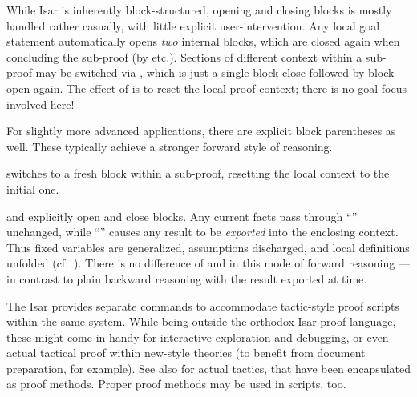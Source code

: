 \begin{isabellebody}
\begin{isamarkuptext}
  While Isar is inherently block-structured, opening and closing
  blocks is mostly handled rather casually, with little explicit
  user-intervention.  Any local goal statement automatically opens
  \emph{two} internal blocks, which are closed again when concluding
  the sub-proof (by \hyperlink{command.qed}{\mbox{}} etc.).  Sections of different
  context within a sub-proof may be switched via \hyperlink{command.next}{\mbox{}},
  which is just a single block-close followed by block-open again.
  The effect of \hyperlink{command.next}{\mbox{}} is to reset the local proof context;
  there is no goal focus involved here!

  For slightly more advanced applications, there are explicit block
  parentheses as well.  These typically achieve a stronger forward
  style of reasoning.

  \begin{descr}

  \item [\hyperlink{command.next}{\mbox{\isa{\isacommand{next}}}}] switches to a fresh block within a
  sub-proof, resetting the local context to the initial one.

  \item [\hyperlink{command.braceleft}{\mbox{\isa{\isacommand{{\isacharbraceleft}}}}} and \hyperlink{command.braceright}{\mbox{\isa{\isacommand{{\isacharbraceright}}}}}] explicitly open and close
  blocks.  Any current facts pass through ``\hyperlink{command.braceleft}{\mbox{\isa{\isacommand{{\isacharbraceleft}}}}}''
  unchanged, while ``\hyperlink{command.braceright}{\mbox{\isa{\isacommand{{\isacharbraceright}}}}}'' causes any result to be
  \emph{exported} into the enclosing context.  Thus fixed variables
  are generalized, assumptions discharged, and local definitions
  unfolded (cf.\ ).  There is no difference
  of \hyperlink{command.assume}{\mbox{}} and \hyperlink{command.presume}{\mbox{}} in this mode of
  forward reasoning --- in contrast to plain backward reasoning with
  the result exported at \hyperlink{command.show}{\mbox{}} time.

  \end{descr}%
\end{isamarkuptext}%
\isamarkuptrue%
%
\isamarkuptrue%
%
\begin{isamarkuptext}%
The Isar provides separate commands to accommodate tactic-style
  proof scripts within the same system.  While being outside the
  orthodox Isar proof language, these might come in handy for
  interactive exploration and debugging, or even actual tactical proof
  within new-style theories (to benefit from document preparation, for
  example).  See also  for actual tactics, that
  have been encapsulated as proof methods.  Proper proof methods may
  be used in scripts, too.


\end{isamarkuptext}
\end{isabellebody}

